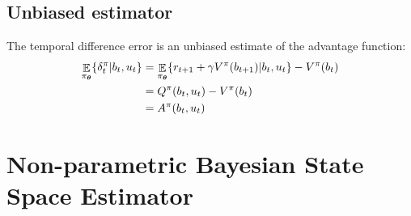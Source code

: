 \begin{appendices}

\section{Unbiased estimator}\label{app:unbiased_delta}

The temporal difference error is an unbiased estimate of the advantage function:
\begin{align}
  \displaystyle \mathop \mathbb{E}_{\pi_{\boldsymbol{\theta}}} \{ \delta^{\pi}_t|b_t,u_t\} &=  \mathop\mathbb{E}_{\pi_{\boldsymbol{\theta}}}\{ r_{t+1} + \gamma V^{\pi}(b_{t+1})|b_t,u_t\} - V^{\pi}(b_t) \nonumber \\
									   &= Q^{\pi}(b_t,u_t) - V^{\pi}(b_t) \nonumber \\
									   &= A^{\pi}(b_t,u_t)
\end{align}


\chapter{Non-parametric Bayesian State Space Estimator}\label{ch5:appendix}


\end{appendices}
